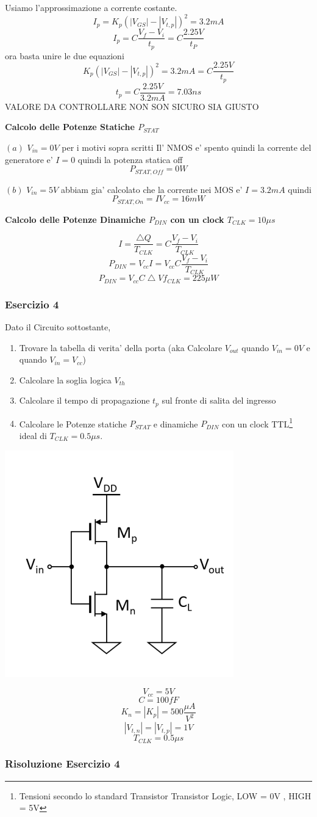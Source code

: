 \documentclass[\main/main.tex]{subfiles}
\begin{document}
Usiamo l'approssimazione a corrente costante.
\[I_p = K_p \left(|V_{GS}| - |V_{t,p}| \right)^2 = 3.2mA\]
\[I_p = C \frac{V_f - V_i}{t_p} = C \frac{2.25V}{t_P}\]
ora basta unire le due equazioni
\[ K_p \left(|V_{GS}| - |V_{t,p}| \right)^2 = 3.2mA = C \frac{2.25V}{t_p}\]
\[t_p = C \frac{2.25V}{3.2mA} = 7.03ns\]
VALORE DA CONTROLLARE NON SON SICURO SIA GIUSTO

\textbf{Calcolo delle Potenze Statiche $P_{STAT}$}

$(a)$ $V_{in} = 0V$ per i motivi sopra scritti Il' NMOS e' spento quindi la corrente del generatore e' $I = 0$ quindi la potenza statica off
\[P_{STAT,Off} = 0W\]

$(b)$ $V_{in} = 5V$ abbiam gia' calcolato che la corrente nei MOS e' $I = 3.2mA$ quindi
\[ P_{STAT,On} = I V_{cc} = 16mW\]

\textbf{Calcolo delle Potenze Dinamiche $P_{DIN}$ con un clock $T_{CLK} = 10 \mu s$}

\[ I = \frac{\bigtriangleup Q}{T_{CLK}} = C \frac{V_f - V_i}{T_{CLK}}\]
\[ P_{DIN} = V_{cc} I = V_{cc} C \frac{V_f - V_i}{T_{CLK}}\]
\[ P_{DIN} = V_{cc} C \bigtriangleup V f_{CLK} = 225 \mu W\]

\clearpage
\subsubsection{Esercizio 4}
Dato il Circuito sottostante,
\begin{enumerate}
\item Trovare la tabella di verita' della porta (aka Calcolare $V_{out}$ quando $V_{in} = 0V$ e quando $V_{in} = V_{cc}$)
\item Calcolare la soglia logica $V_{th}$
\item Calcolare il tempo di propagazione  $t_p$ sul fronte di salita del ingresso
\item Calcolare le Potenze statiche $P_{STAT}$ e dinamiche $P_{DIN}$ con un clock TTL\footnote{Tensioni secondo lo standard Transistor Transistor Logic, LOW = 0V , HIGH = 5V} ideal di $T_{CLK} = 0.5\mu s$.
\end{enumerate}

\begin{center}
\includegraphics{esercizio4}
\end{center}
\[V_{cc}= 5V\]
\[C = 100fF\]
\[K_n = |K_p| = 500 \frac{\mu A}{V^2}\]
\[|V_{t,n}| = |V_{t,p}| = 1V\]
\[T_{CLK} = 0.5\mu s\]

\clearpage
\subsubsection{Risoluzione Esercizio 4}
\end{document}
